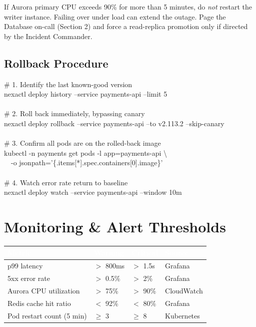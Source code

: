 \documentclass[11pt,a4paper,parskip=half]{scrartcl}
\begin{document}
\begin{dangerbox}
If Aurora primary CPU exceeds 90\% for more than 5 minutes, do \emph{not} restart the
writer instance. Failing over under load can extend the outage. Page the Database
on-call (Section 2) and force a read-replica promotion only if directed by the
Incident Commander.
\end{dangerbox}

\subsection{Rollback Procedure}

\begin{cmdbox}
\# 1. Identify the last known-good version\\
nexactl deploy history --service payments-api --limit 5\\
\\
\# 2. Roll back immediately, bypassing canary\\
nexactl deploy rollback --service payments-api --to v2.113.2 --skip-canary\\
\\
\# 3. Confirm all pods are on the rolled-back image\\
kubectl -n payments get pods -l app=payments-api \textbackslash\\
\ \ -o jsonpath='\{.items[*].spec.containers[0].image\}'\\
\\
\# 4. Watch error rate return to baseline\\
nexactl deploy watch --service payments-api --window 10m
\end{cmdbox}

\section{Monitoring \& Alert Thresholds}

\begin{tabularx}{\linewidth}{@{}X l l l@{}}
\toprule
\rowcolor{navy!85}
\textcolor{white}{\textbf{Metric}} & \textcolor{white}{\textbf{Warning}} & \textcolor{white}{\textbf{Critical}} & \textcolor{white}{\textbf{Source}} \\
\midrule
p99 latency & $>$ 800ms & $>$ 1.5s & Grafana \\
\rowcolor{navy!4}
5xx error rate & $>$ 0.5\% & $>$ 2\% & Grafana \\
Aurora CPU utilization & $>$ 75\% & $>$ 90\% & CloudWatch \\
\rowcolor{navy!4}
Redis cache hit ratio & $<$ 92\% & $<$ 80\% & Grafana \\
Pod restart count (5 min) & $\geq$ 3 & $\geq$ 8 & Kubernetes \\
\bottomrule
\end{tabularx}
\end{document}
